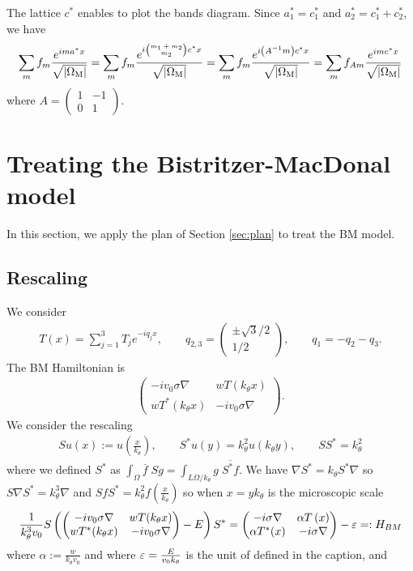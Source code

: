 \documentclass[11pt,a4paper,reqno,french,tikz]{amsart}
\newcommand{\pa}[1]{\left( #1 \right)} %
\newcommand{\ab}[1]{\left|#1\right|} %
\newcommand{\na}{\nabla} %
\newcommand{\f}[2]{\frac{#1}{#2}} %
\newcommand{\ind}[1]{_{\textup{#1}}} %
\newcommand{\mat}[1]{\begin{pmatrix} #1 \end{pmatrix}} %
\newcommand{\sqom}{\sqrt{\ab{\Omega\ind{M}}}}
\begin{document}
The lattice $c^*$ enables to plot the bands diagram. Since $a_1^* = c_1^*$ and $a_2^* = c_1^* + c_2^*$, we have
\begin{align*}
\sum_m f_m \f{e^{ima^*x}}{\sqom} = \sum_m f_m \f{e^{i {\tiny{\mat{m_1 + m_2 \\ m_2}}} c^* x}}{\sqom} = \sum_ m f_{m} \f{e^{i\pa{A^{-1}m}c^*x}}{\sqom}= \sum_ m f_{Am} \f{e^{imc^*x}}{\sqom}
\end{align*}
where $A = \mat{1 & -1 \\ 0 & 1}$.



\section{Treating the Bistritzer-MacDonal model}
\label{sec:comparision_between_bm_and_our_model}

In this section, we apply the plan of Section \ref{sec:plan} to treat the BM model.

\subsection{Rescaling}%
\label{sub:rescaling}

We consider 
\begin{align*}
T(x) = \sum_{j=1}^3 T_j e^{-i q_j x}, \qquad q_{2,3} = \mat{\pm \sqrt{3}/2 \\ 1/2}, \qquad q_1 = - q_2 - q_3.
\end{align*}
The BM Hamiltonian is
\begin{align*}
\mat{-i v_0 \sigma \na & w T(k_\theta x) \\ w T^*(k_\theta x) & -iv_0 \sigma \na}.
\end{align*}
We consider the rescaling
\begin{align*}
Su(x) := u\pa{\f{x}{k_\theta}}, \qquad S^*u(y) = k_\theta^2 u\pa{k_\theta y}, \qquad S S^* = k_\theta^2
\end{align*}
where we defined $S^*$ as $\int_\Omega \overline{f} \; Sg = \int_{L\Omega/k_\theta} g \; \overline{S^*f}$.
We have $\na S^* = k_\theta S^* \na$ so $S \na S^* = k_\theta^3 \na$ and $SfS^* = k_\theta^2 f\pa{\f{x}{k_\theta}}$ so when $x = y k_\theta$ is the microscopic scale
\begin{align}\label{def:conjugation}
	\f{1}{k_\theta^3 v_0} S \pa{\mat{-i v_0 \sigma \na & w T(k_\theta x) \\ w T^*(k_\theta x) & -iv_0 \sigma \na} -E} S^* = \mat{-i\sigma \na & \alpha T\pa{x} \\ \alpha T^*(x) & -i\sigma \na} - \ep =: H_{BM}
\end{align}
where $\alpha := \f{w}{k_\theta v_0}$ and where $\ep = \f{E}{v_0 k_\theta}$ is the unit of \cite[Fig 1]{TarKruVis19} defined in the caption, and
\end{document}
